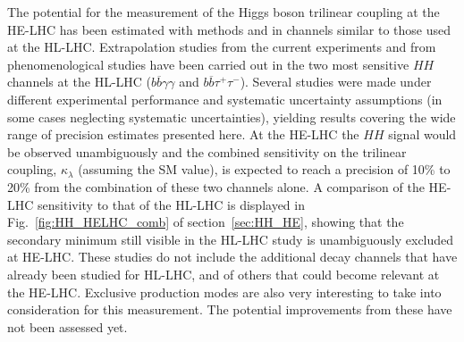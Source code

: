 \documentclass[../report.tex]{subfiles}
\begin{document}

The potential for the measurement of the Higgs boson trilinear coupling at the HE-LHC has been estimated with methods and in channels similar to those used at the HL-LHC. Extrapolation studies from the current experiments and from phenomenological studies have been carried out in the two most sensitive $HH$ channels at the HL-LHC ($b\overline{b}\gamma\gamma$ and $b\overline{b}\tau^+\tau^-$). 
Several studies were made under different experimental performance and systematic uncertainty assumptions (in some cases neglecting systematic uncertainties), yielding results covering the wide range of precision estimates presented here. At the HE-LHC the $HH$ signal would be observed unambiguously and the combined sensitivity on the trilinear coupling, $\kappa_{\lambda}$ (assuming the SM value), is expected to reach a precision of 10\% to 20\% from the combination of these two channels alone. A comparison of the HE-LHC sensitivity to that of the HL-LHC is displayed in Fig.~\ref{fig:HH_HELHC_comb} of section~\ref{sec:HH_HE}, showing that the secondary minimum still visible in the HL-LHC study is unambiguously excluded at HE-LHC. 
These studies do not include the additional decay channels that have already been studied for HL-LHC, and of others that could become relevant at the HE-LHC. Exclusive production modes are also very interesting to take into consideration for this measurement. The potential improvements from these have not been assessed yet.
\end{document}
